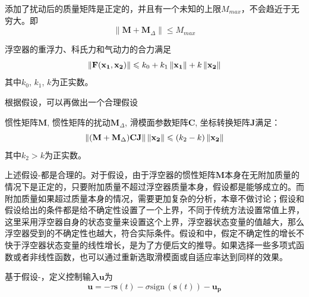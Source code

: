\begin{ass}\label{3ass:M}
添加了扰动后的质量矩阵是正定的，并且有一个未知的上限$M_{max}$，不会趋近于无穷大。即
\begin{equation}\label{eq:3assM}
    \lVert\mathbf{M}+\mathbf{M}_{\Delta}\rVert\leqslant M_{max}
\end{equation}
\end{ass}
\begin{ass}\label{3ass:F}
浮空器的重浮力、科氏力和气动力的合力满足
\begin{equation}\label{eq:3assF}
    \left\lVert\mathbf{F(x_1,x_2)}\right\rVert\leqslant k_0+k_1\left\lVert\mathbf{x_1}\right\rVert+k\left\lVert\mathbf{x_2}\right\rVert
\end{equation}
其中$k_0$, $k_1$, $k$为正实数。
\end{ass}
根据假设，可以再做出一个合理假设
\begin{ass}\label{3ass:MCJ}
惯性矩阵$\mathbf{M}$, 惯性矩阵的扰动$\mathbf{M}_{\Delta}$, 滑模面参数矩阵$\mathbf{C}$, 坐标转换矩阵$\mathbf{J}$满足：
\begin{equation}
    \lVert(\mathbf{M}+\mathbf{M}_{\Delta})\mathbf{CJ}\rVert\left\lVert\mathbf{x_2}\right\rVert\leqslant (k_2-k)\left\lVert\mathbf{x_2}\right\rVert
\end{equation}
其中$k_2>k$为正实数。
\end{ass}

\begin{rem}
上述假设-都是合理的。对于假设，由于浮空器的惯性矩阵$\mathbf{M}$本身在无附加质量的情况下是正定的，只要附加质量不超过浮空器质量本身，假设都是能够成立的。而附加质量如果超过质量本身的情况，需要更加复杂的分析，本章不做讨论；假设和假设给出的条件都是给不确定性设置了一个上界，不同于传统方法设置常值上界，这里采用浮空器自身的状态变量来设置这个上界，浮空器状态变量的值越大，那么浮空器受到的不确定性也越大，符合实际条件。假设和中，假定不确定性的增长不快于浮空器状态变量的线性增长，是为了方便后文的推导。如果选择一些多项式函数或者非线性函数，也可以通过重新选取滑模面或自适应率达到同样的效果。
\end{rem}

基于假设-，定义控制输入$\mathbf{u}$为
\begin{equation}\label{eq:3input}
\mathbf{u} = -\tau\mathbf{s}(t)-\sigma \mathrm{sign}\,(\mathbf{s}(t)) - \mathbf{u_p}
\end{equation}


